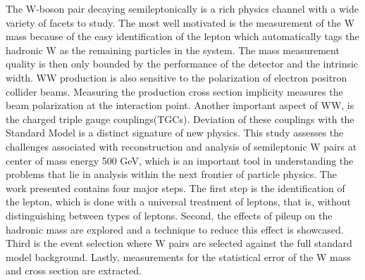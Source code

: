 The W-boson pair decaying semileptonically is a rich physics channel with a wide variety of facets to study. The most well motivated is the measurement of the W mass because of the easy identification of the lepton which automatically tags the hadronic W as the remaining particles in the system. The mass measurement quality is then only bounded by the performance of the detector and the intrinsic width. WW production is also sensitive to the polarization of electron positron collider beams.  Measuring the production cross section implicity measures the beam polarization at the interaction point. Another important aspect of WW, is the charged triple gauge couplings(TGCs). Deviation of these couplings with the Standard Model is a distinct signature of new physics. This study assesses the challenges associated with reconstruction and analysis of semileptonic W pairs at center of mass energy 500 GeV, which is an important tool in understanding the problems that lie in analysis within the next frontier of particle physics. The work presented contains four major steps. The first step is the identification of the lepton, which is done with a universal treatment of leptons, that is, without distinguishing between types of leptons.  Second, the effects of pileup on the hadronic mass are explored and a technique to reduce this effect is showcased. Third is the event selection where W pairs are selected against the full standard model background. Lastly, measurements for the statistical error of the W mass and cross section are extracted.